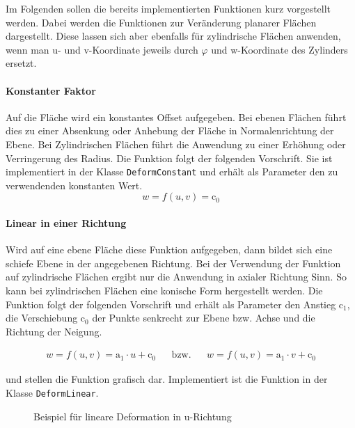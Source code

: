 Im Folgenden sollen die bereits implementierten Funktionen kurz vorgestellt werden. Dabei werden die Funktionen zur Veränderung planarer Flächen dargestellt. Diese lassen sich aber ebenfalls für zylindrische Flächen anwenden, wenn man u- und v-Koordinate jeweils durch $\varphi$ und w-Koordinate des Zylinders ersetzt. 

\paragraph{Konstanter Faktor} Auf die Fläche wird ein konstantes Offset aufgegeben. Bei ebenen Flächen führt dies zu einer Absenkung oder Anhebung der Fläche in Normalenrichtung der Ebene. Bei Zylindrischen Flächen führt die Anwendung zu einer Erhöhung oder Verringerung des Radius. 
Die Funktion folgt der folgenden Vorschrift. Sie ist implementiert in der Klasse \verb|DeformConstant| und erhält als Parameter den zu verwendenden konstanten Wert. 
\begin{equation}\label{eq:constant}
	w=f(u,v) = \mathrm{c_0}
\end{equation}

\paragraph{Linear in einer Richtung} Wird auf eine ebene Fläche diese Funktion aufgegeben, dann bildet sich eine schiefe Ebene in der angegebenen Richtung. Bei der Verwendung der Funktion auf zylindrische Flächen ergibt nur die Anwendung in axialer Richtung Sinn. So kann bei zylindrischen Flächen eine konische Form hergestellt werden. Die Funktion folgt der folgenden Vorschrift und erhält als Parameter den Anstieg $\mathrm{c_1}$, die Verschiebung $\mathrm{c_0}$ der Punkte senkrecht zur Ebene bzw. Achse und die Richtung der Neigung. 

\begin{equation}	
	\begin{aligned}\label{eq:linear}
		w=f(u,v) = \mathrm{a_1}\cdot u+\mathrm{c_0}&&\mathrm{bzw.}&&w=f(u,v) = \mathrm{a_1}\cdot v+\mathrm{c_0}
	\end{aligned}
\end{equation}

 und  stellen die Funktion grafisch dar. Implementiert ist die Funktion in der Klasse \verb|DeformLinear|.

\begin{figure}[h]
	\centering
	\caption{Beispiel für lineare Deformation in u-Richtung}
	\label{fig:linearufig}
\end{figure}

